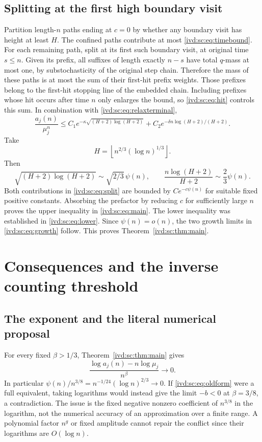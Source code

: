 \documentclass[11pt,letterpaper]{article}
\theoremstyle{remark}\newtheorem{remark}[theorem]{Remark}
\numberwithin{equation}{section}
\begin{document}
\subsection{Splitting at the first high boundary visit}
Partition length-$n$ paths ending at $c=0$ by whether any boundary visit
has height at least $H$. The confined paths contribute at most
\eqref{ivd:sc:eq:timebound}. For each remaining path, split at its first such
boundary visit, at original time $s\le n$. Given its prefix, all
suffixes of length exactly $n-s$ have total $q$-mass at most one, by
substochasticity of the original step chain. Therefore the mass of these
paths is at most the sum of their first-hit prefix weights. Those
prefixes belong to the first-hit stopping line of the embedded chain.
Including prefixes whose hit occurs after time $n$ only enlarges the
bound, so \eqref{ivd:sc:eq:hit} controls this sum. In combination with
\eqref{ivd:sc:eq:relaxterminal},
\begin{equation}\label{ivd:sc:eq:split}
 \frac{a_j(n)}{\mu_j^n}\le
 C_1e^{-\kappa\sqrt{(H+2)\log(H+2)}}
 +C_2e^{-\delta n\log(H+2)/(H+2)}.
\end{equation}
Take
\[
 H=\left\lfloor n^{2/3}(\log n)^{1/3}\right\rfloor.
\]
Then
\[
 \sqrt{(H+2)\log(H+2)}\sim\sqrt{2/3}\,\psi(n),\qquad
 \frac{n\log(H+2)}{H+2}\sim\frac23\psi(n).
\]
Both contributions in \eqref{ivd:sc:eq:split} are bounded by
$C e^{-c\psi(n)}$ for suitable fixed positive constants. Absorbing the
prefactor by reducing $c$ for sufficiently large $n$ proves the upper
inequality in \eqref{ivd:sc:eq:main}. The lower inequality was established in
\eqref{ivd:sc:eq:lower}. Since $\psi(n)=o(n)$, the two growth limits in
\eqref{ivd:sc:eq:growth} follow. This proves Theorem~\ref{ivd:sc:thm:main}.

\section{Consequences and the inverse counting threshold}\label{ivd:sc:sec:consequences}
\subsection{The exponent and the literal numerical proposal}\label{ivd:sc:sub:exponent}
For every fixed $\beta>1/3$, Theorem~\ref{ivd:sc:thm:main} gives
\begin{equation}\label{ivd:sc:eq:beta}
 \frac{\log a_j(n)-n\log\mu_j}{n^\beta}\longrightarrow0.
\end{equation}
In particular $\psi(n)/n^{3/8}=n^{-1/24}(\log n)^{2/3}\to0$.
If \eqref{ivd:sc:eq:oldform} were a full equivalent, taking logarithms would
instead give the limit $-b<0$ at $\beta=3/8$, a contradiction.
The issue is the fixed negative nonzero coefficient of $n^{3/8}$ in
the logarithm, not the numerical accuracy of an approximation over a
finite range. A polynomial factor $n^g$ or fixed amplitude cannot repair
the conflict since their logarithms are $O(\log n)$.
\end{document}
